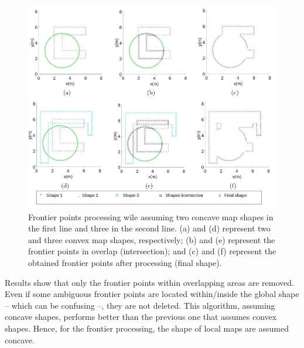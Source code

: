 \documentclass[11pt,openany]{book}
\begin{document}
\begin{figure}[H]
    \centering
    \includegraphics[scale=0.4]{assets/3_7.png}
    \caption{Frontier points processing wile assuming two concave map shapes in the ﬁrst line and three in the second line. (a) and (d) represent two and three convex map shapes, respectively; (b) and (e) represent the frontier points in overlap (intersection); and (c) and (f) represent the obtained frontier points after processing (ﬁnal shape).}
    \label{fig:3.7}
\end{figure}
Results show that only the frontier points within overlapping areas are removed. Even if some ambiguous frontier points are located within/inside the global shape – which can be confusing –, they are not deleted. This algorithm, assuming concave shapes, performs better than the previous one that assumes convex shapes. Hence, for the frontier processing, the shape of local maps are assumed concave.
\end{document}

